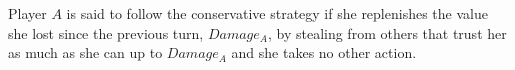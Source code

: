 \begin{definition}
   Player $A$ is said to follow the conservative strategy if she replenishes the value she lost since the previous turn,
   $Damage_A$, by stealing from others that trust her as much as she can up to $Damage_A$ and she takes no other action.
\end{definition}
